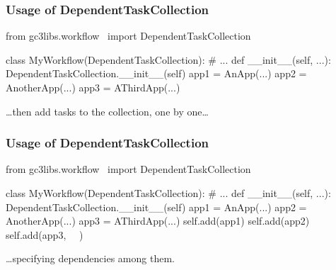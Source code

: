 \documentclass[english,serif,mathserif,xcolor=pdftex,dvipsnames,table]{beamer}
\begin{document}
\begin{frame}[fragile]
  \frametitle{Usage of DependentTaskCollection}

\begin{python}
from gc3libs.workflow \
  import DependentTaskCollection

class MyWorkflow(DependentTaskCollection):
  # ...
  def __init__(self, ...):
    DependentTaskCollection.__init__(self)
    app1 = AnApp(...)
    app2 = AnotherApp(...)
    app3 = AThirdApp(...)
    ~~
    ~~
    ~~
\end{python}

  \+
  \ldots then add tasks to the collection, one by one\ldots
\end{frame}


\begin{frame}[fragile]
  \frametitle{Usage of DependentTaskCollection}

\begin{python}
from gc3libs.workflow \
  import DependentTaskCollection

class MyWorkflow(DependentTaskCollection):
  # ...
  def __init__(self, ...):
    DependentTaskCollection.__init__(self)
    app1 = AnApp(...)
    app2 = AnotherApp(...)
    app3 = AThirdApp(...)
    self.add(app1)
    self.add(app2)
    self.add(app3, ~~)
\end{python}

  \+
  \ldots specifying dependencies among them.
\end{frame}
\end{document}
